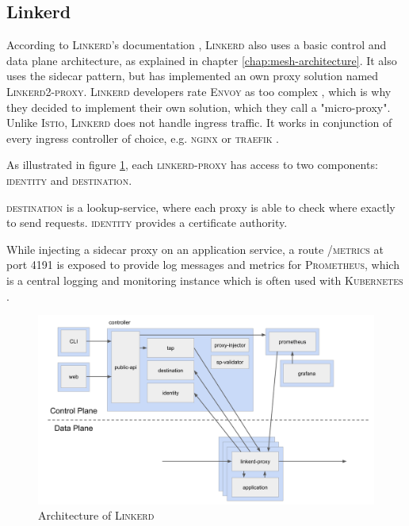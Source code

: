 \subsection{Linkerd}
\label{linkerd}
According to \textsc{Linkerd}'s documentation \cite{linkerd-docs-arch}, \textsc{Linkerd} also uses a basic control and data plane architecture, as explained in chapter \ref{chap:mesh-architecture}. It also uses the sidecar pattern, but has implemented an own proxy solution named \textsc{Linkerd2-proxy}. \textsc{Linkerd} developers rate \textsc{Envoy} as too complex \cite{linkerd-docs-no-envoy}, which is why they decided to implement their own solution, which they call a "micro-proxy". 
Unlike \textsc{Istio}, \textsc{Linkerd} does not handle ingress traffic. It works in conjunction of every ingress controller of choice, e.g. \textsc{nginx} or \textsc{traefik} \cite{linkerd-docs-faq}.

As illustrated in figure \ref{fig:arch-linkerd}, each \textsc{linkerd-proxy} has access to two components: \textsc{identity} and \textsc{destination}.

\textsc{destination} is a lookup-service, where each proxy is able to check where exactly to send requests. \textsc{identity} provides a certificate authority.

While injecting a sidecar proxy on an application service, a route \textsc{/metrics} at port 4191 is exposed to provide log messages and metrics for \textsc{Prometheus}, which is a central logging and monitoring instance which is often used with \textsc{Kubernetes} \cite{linkerd-docs-arch}.

\begin{figure}
    \includegraphics[width=\columnwidth]{img/linkerd_architecture.png}
    \caption{Architecture of \textsc{Linkerd} \cite{linkerd-docs-arch}}
    \label{fig:arch-linkerd}
\end{figure}

